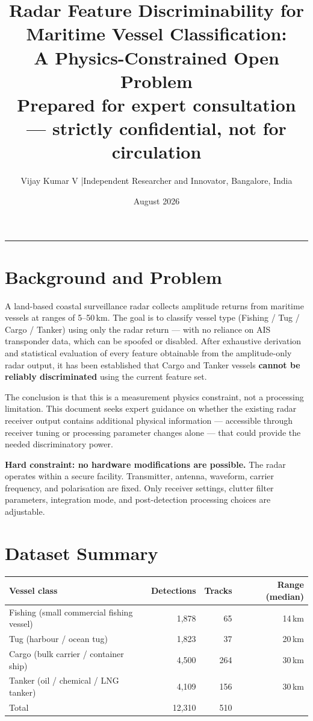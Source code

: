 \documentclass[10.5pt,a4paper]{article}
\title{\textbf{Radar Feature Discriminability for Maritime Vessel Classification:\\
A Physics-Constrained Open Problem}\\[2pt]
\small\normalfont Prepared for expert consultation — strictly confidential,
not for circulation}
\author{\small Vijay Kumar V \quad|\quad Independent Researcher and Innovator,
Bangalore, India}
\date{\small August 2026}
\begin{document}
\maketitle\vspace{-8pt}
\hrule\vspace{6pt}

\section{Background and Problem}

A land-based coastal surveillance radar collects amplitude returns from maritime
vessels at ranges of 5--50\,km. The goal is to classify vessel type
(Fishing / Tug / Cargo / Tanker) using only the radar return — with no reliance on
AIS transponder data, which can be spoofed or disabled. After exhaustive derivation
and statistical evaluation of every feature obtainable from the amplitude-only radar
output, it has been established that Cargo and Tanker vessels \textbf{cannot be
reliably discriminated} using the current feature set.

The conclusion is that this is a measurement physics constraint, not a processing
limitation. This document seeks expert guidance on whether the existing radar
receiver output contains additional physical information — accessible through
receiver tuning or processing parameter changes alone — that could provide the
needed discriminatory power.

\textbf{Hard constraint: no hardware modifications are possible.} The radar operates
within a secure facility. Transmitter, antenna, waveform, carrier frequency, and
polarisation are fixed. Only receiver settings, clutter filter parameters, integration
mode, and post-detection processing choices are adjustable.

\section{Dataset Summary}

\begin{center}\small
\begin{tabular}{lrrr}
\toprule
Vessel class & Detections & Tracks & Range (median) \\
\midrule
Fishing (small commercial fishing vessel) & 1,878 & 65 & 14\,km \\
Tug (harbour / ocean tug)                 & 1,823 & 37 & 20\,km \\
Cargo (bulk carrier / container ship)     & 4,500 & 264 & 30\,km \\
Tanker (oil / chemical / LNG tanker)      & 4,109 & 156 & 30\,km \\
\midrule
Total & 12,310 & 510 & \\
\bottomrule
\end{tabular}
\end{center}
\end{document}
